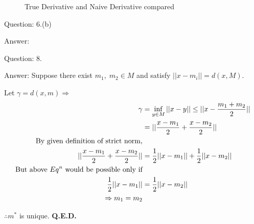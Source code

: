 \documentclass[a4paper]{article}
\begin{document}
\begin{qalist}
\begin{figure}[H]
				\caption{True Derivative and Naive Derivative compared} 
				\label{fig:q6_a_3}
				\vspace{0.5cm}
			\end{figure}
		\item[Question: 6.(b)] \setcounter{equation}{0}
		\item[Answer:] 	
		\item[Question: 8.] \setcounter{equation}{0} %
		\item[Answer:] 	Suppose there exist ${m}_{1},\; {m}_{2} \in M$ and satisfy $||x-{m}_{i}|| = d(x,M)$.
		
		Let $\gamma = d(x,m) \Rightarrow$
		\begin{align}
			\gamma &= \inf_{y\in M} ||x-y|| \leq  ||x - \frac{{m}_{1} + {m}_{2}}{2}|| \\
			&=||\frac{x-{m}_{1}}{2}+\frac{x-{m}_{2}}{2}|| \\
			\text{By given definition of strict norm,} \notag \\
			||\frac{x-{m}_{1}}{2}+\frac{x-{m}_{2}}{2}|| &= \frac{1}{2} ||x-{m}_{1}|| + \frac{1}{2} ||x-{m}_{2}|| \\
			\text{But above ${Eq}^{n}$ would be possible only if} \notag \\
			 \frac{1}{2} ||x-{m}_{1}|| &= \frac{1}{2} ||x-{m}_{2}|| \\
			 \Rightarrow {m}_{1} = {m}_{2}
		\end{align}
		
		$\therefore {m}^{*}$ is unique. \textbf{Q.E.D.}
		
		
		

\end{qalist}
\end{document}
